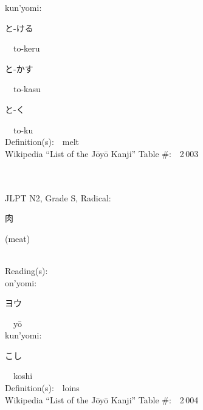 \begin{multicols}{2}
{\hspace*{1em}}kun'yomi:\ \ \\
{\hspace*{2em}}{\begin{CJK}{UTF8}{min} と-ける \end{CJK}}\ \ to-keru\ \ \\
{\hspace*{2em}}{\begin{CJK}{UTF8}{min} と-かす \end{CJK}}\ \ to-kasu\ \ \\
{\hspace*{2em}}{\begin{CJK}{UTF8}{min} と-く \end{CJK}}\ \ to-ku\ \ \\
Definition(s):\ \ melt \\
Wikipedia ``List of the J\=oy\=o Kanji'' Table \#:\ \ 2\,003 \\
\ \ \\
{\fontsize{34pt}{40pt}  }\ \ \\  %
{JLPT N2, Grade S, Radical:\ \ {\begin{CJK}{UTF8}{min} 肉 \end{CJK}} (meat) } \\
Reading(s):\ \ \\
{\hspace*{1em}}on'yomi:\ \ \\
{\hspace*{2em}}{\begin{CJK}{UTF8}{min} ヨウ \end{CJK}}\ \ y\=o\ \ \\
{\hspace*{1em}}kun'yomi:\ \ \\
{\hspace*{2em}}{\begin{CJK}{UTF8}{min} こし \end{CJK}}\ \ koshi\ \ \\
Definition(s):\ \ loins \\
Wikipedia ``List of the J\=oy\=o Kanji'' Table \#:\ \ 2\,004 \\
\ \ \\
{\fontsize{34pt}{40pt}  }\ \ \\

\end{multicols}
